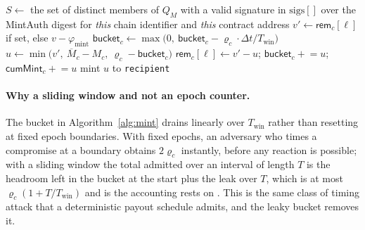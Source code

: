\begin{algorithm}[H]
\caption{Contract-side admission of \texttt{mint} on chain $c$. \planned}
\label{alg:mint}
\BlankLine
{}
$S \leftarrow$ the set of distinct members of $Q_M$ with a valid signature in $\mathrm{sigs}[]$ over
the MintAuth digest for \emph{this} chain identifier and \emph{this} contract address\;
$v' \leftarrow \mathsf{rem}_c[\ell]$ if set, else $v - \varphi_{\mathrm{mint}}$
$\mathsf{bucket}_c \leftarrow \max\!\big(0,\ \mathsf{bucket}_c - \varrho_c \cdot \Delta t / T_{\mathrm{win}}\big)$
$u \leftarrow \min\!\big(v',\ \overline{M}_c - M_c,\ \varrho_c - \mathsf{bucket}_c\big)$
$\mathsf{rem}_c[\ell] \leftarrow v' - u$;\quad
{}
$\mathsf{bucket}_c \mathrel{+}= u$;\quad
$\mathsf{cumMint}_c \mathrel{+}= u$\;
mint $u$ to \texttt{recipient}\;
\end{algorithm}

\paragraph{Why a sliding window and not an epoch counter.} The bucket in
Algorithm~\ref{alg:mint} drains linearly over $T_{\mathrm{win}}$ rather than resetting at fixed epoch
boundaries. With fixed epochs, an adversary who times a compromise at a boundary obtains
$2\varrho_c$ instantly, before any reaction is possible; with a sliding window the total admitted over
an interval of length $T$ is the headroom left in the bucket at the start plus the leak over $T$,
which is at most $\varrho_c(1 + T/T_{\mathrm{win}})$ and is the accounting
 rests on \srcinferred. This is the same class of timing attack that a
deterministic payout schedule admits, and the leaky bucket removes it.

